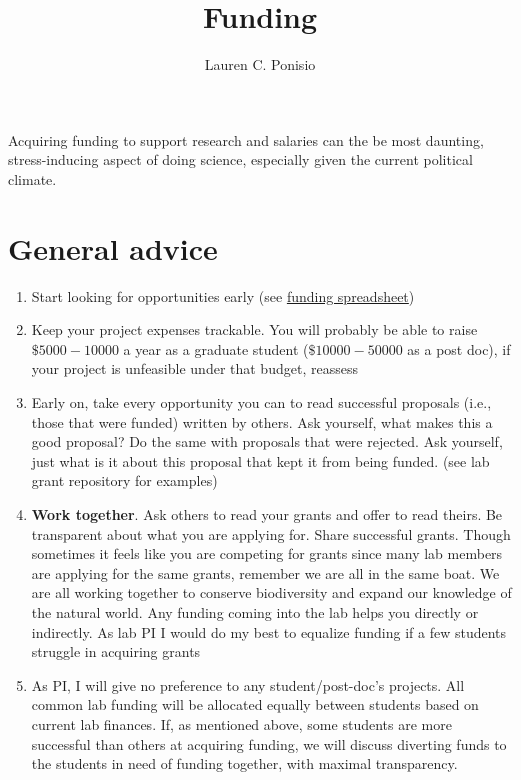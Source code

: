 \documentclass[12pt]{article}
\title{Funding}
\author{Lauren C. Ponisio}
\begin{document}
\maketitle

Acquiring funding to support research and salaries can the be most
daunting, stress-inducing aspect of doing science, especially given
the current political climate.

\section{General advice}

\begin{enumerate}
\item Start looking for opportunities early (see 
  \href{https://docs.google.com/spreadsheets/d/1X2Dyz4HW13hsTmNoUvSoMYOmyobVVtfoGtEtdS0LQtI/edit?usp=sharing}{funding
    spreadsheet}) 
\item Keep your project expenses trackable. You will probably be able
  to raise $\$5000-10000$ a year as a graduate student
  ($\$10000-50000$ as a post doc), if your project is unfeasible under
  that budget, reassess
\item Early on, take every opportunity you can to read successful
  proposals (i.e., those that were funded) written by others. Ask
  yourself, what makes this a good proposal? Do the same with
  proposals that were rejected. Ask yourself, just what is it about
  this proposal that kept it from being funded. (see lab grant
  repository for examples)
\item \textbf{Work together}. Ask others to read your grants and offer
  to read theirs. Be transparent about what you are applying
  for. Share successful grants. Though sometimes it feels like you are
  competing for grants since many lab members are applying for the
  same grants, remember we are all in the same boat. We are all
  working together to conserve biodiversity and expand our knowledge
  of the natural world. Any funding coming into the lab helps you
  directly or indirectly. As lab PI I would do my best to equalize
  funding if a few students struggle in acquiring grants
\item As PI, I will give no preference to any student/post-doc's
  projects. All common lab funding will be allocated equally between
  students based on current lab finances. If, as mentioned above, some
  students are more successful than others at acquiring funding, we will
  discuss diverting funds to the students in need of funding
  together, with maximal transparency. 
\end{enumerate}
\end{document}
